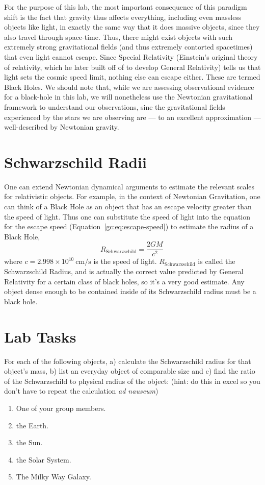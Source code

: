 For the purpose of this lab, the most important consequence of this paradigm shift is the fact that
gravity thus affects everything, including even massless objects like light, in exactly the same way that
it does massive objects, since they also travel through space-time. Thus, there might exist objects with 
such extremely strong gravitational fields (and thus extremely contorted spacetimes) that even light
cannot escape. Since Special Relativity (Einstein’s original theory of relativity, which he later built
off of to develop General Relativity) tells us that light sets the cosmic speed limit, nothing else can
escape either. These are termed Black Holes. We should note that, while we are assessing observational
evidence for a black-hole in this lab, we will nonetheless use the Newtonian gravitational framework to
understand our observations, sine the gravitational fields experienced by the stars we are observing are
--- to an excellent approximation --- well-described by Newtonian gravity.

\section{Schwarzschild Radii}

One can extend Newtonian dynamical arguments to estimate the relevant scales for relativistic objects.
For example, in the context of Newtonian Gravitation, one can think of a Black Hole as an object that
has an escape velocity greater than the speed of light. Thus one can substitute the speed of light into
the equation for the escape speed (Equation~\ref{gc:eq:escape-speed}) to estimate the radius of a Black Hole,
\begin{equation}
 R_\textrm{Schwarzschild} = \frac{2 G M}{c^2} \,
\end{equation}
where $c = 2.998 \times 10^{10}\:\mathrm{cm}/\mathrm{s}$ is the speed of light. $R_\textrm{Schwarzschild}$ is called the Schwarzschild Radius, and is actually the correct value predicted by General
Relativity for a certain class of black holes, so it’s a very good estimate. Any object dense enough to be
contained inside of its Schwarzschild radius must be a black hole.

\section{Lab Tasks}

For each of the following objects, a) calculate the Schwarzschild radius for that object’s mass, b) list
an everyday object of comparable size and c) find the ratio of the Schwarzschild to physical radius of
the object: (hint: do this in excel so you don’t have to repeat the calculation \textit{ad nauseum})
\begin{enumerate}
	\item One of your group members.
	\item the Earth.
	\item the Sun.
	\item the Solar System.
	\item The Milky Way Galaxy.
\end{enumerate}


